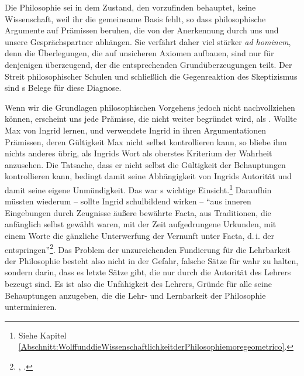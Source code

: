 Die Philosophie sei in dem Zustand, den  vorzufinden
behauptet, keine Wissenschaft, weil ihr die gemeinsame Basis fehlt, so dass
philosophische Argumente auf Prämissen beruhen, die von der Anerkennung durch
uns und unsere Gesprächspartner abhängen. Sie verfährt daher viel stärker \emph{ad
hominem}, denn die Überlegungen, die auf unsicheren Axiomen aufbauen, sind nur
für denjenigen überzeugend, der die entsprechenden Grundüberzeugungen teilt. Der
Streit philosophischer Schulen und schließlich die Gegenreaktion des
Skeptizismus sind s Belege für diese Diagnose.

Wenn wir die Grundlagen philosophischen Vorgehens jedoch nicht nachvollziehen
können, erscheint uns jede Prämisse, die nicht weiter begründet wird, als
. Wollte Max von Ingrid lernen, und
verwendete Ingrid in ihren Argumentationen Prämissen, deren Gültigkeit Max nicht
selbst kontrollieren kann, so bliebe ihm nichts anderes übrig, als Ingrids Wort
als oberstes Kriterium der Wahrheit anzusehen. Die Tatsache, dass er nicht
selbst die Gültigkeit der Behauptungen kontrollieren kann, bedingt damit seine
Abhängigkeit von Ingrids Autorität und damit seine eigene Unmündigkeit. Das war
s wichtige
Einsicht.\footnote{Siehe Kapitel
\ref{Abschnitt:WolffunddieWissenschaftlichkeitderPhilosophiemoregeometrico}.}
Daraufhin müssten wiederum -- sollte Ingrid schulbildend wirken --
\enquote{aus inneren Eingebungen durch Zeugnisse äußere bewährte Facta, aus
Traditionen, die anfänglich selbst gewählt waren, mit der Zeit aufgedrungene
Urkunden, mit einem Worte die gänzliche Unterwerfung der Vernunft unter Facta,
d.\,i. der  entspringen}\footnote{\cite[][A 327]{Kant:Washeisst:SichimDenkenorientieren?1977}, \cite[][VIII:
145.30--34]{Kant:GesammelteWerke1900ff.}.}. Das Problem der unzureichenden
Fundierung für die Lehrbarkeit der Philosophie besteht also nicht in der Gefahr,
falsche Sätze für wahr zu halten, sondern darin, dass es letzte Sätze gibt, die
nur durch die Autorität des Lehrers bezeugt sind. Es ist also die Unfähigkeit
des Lehrers, Gründe für alle seine Behauptungen anzugeben, die die Lehr- und
Lernbarkeit der Philosophie unterminieren.

